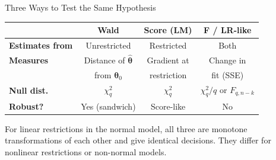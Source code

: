 \documentclass[handout, aspectratio=169]{beamer}
\numberwithin{equation}{section}
\begin{document}
\begin{frame}{Three Ways to Test the Same Hypothesis}

\begin{center}
\renewcommand{\arraystretch}{1.2}
\begin{tabular}{lccc}
\toprule
 & \textbf{Wald} & \textbf{Score (LM)} & \textbf{F / LR-like} \\
\midrule
\textbf{Estimates from} & Unrestricted & Restricted & Both \\
\textbf{Measures} & Distance of $\hat{\bm{\theta}}$ & Gradient at & Change in \\
 & from $\bm{\theta}_0$ & restriction & fit (SSE) \\
\textbf{Null dist.} & $\chi^2_q$ & $\chi^2_q$ & $\chi^2_q/q$ or $F_{q,n-k}$ \\
\textbf{Robust?} & Yes (sandwich) & Score-like & No \\
\bottomrule
\end{tabular}
\end{center}

\pause

\begin{tcolorbox}[colback=blue!5, colframe=blue!50]
For linear restrictions in the normal model, all three are monotone transformations of each other and give identical decisions. They differ for nonlinear restrictions or non-normal models.
\end{tcolorbox}
\end{frame}
\end{document}
